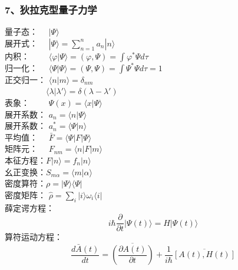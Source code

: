 \begin{frame}  [allowframebreaks=]
    \frametitle{7、狄拉克型量子力学}  
    量子态： $\hspace{1em}|\Psi \rangle $ \\ \vspace{0.2em}
    展开式： $\hspace{1em}|\Psi \rangle =\sum\limits_{n=1} ^n a_n |n \rangle$ \\
    内积：   $\hspace{2em}\langle \varphi | \Psi \rangle = (\varphi, \Psi)= \int \varphi^*\Psi d\tau $ \\  \vspace{0.2em}
    归一化： $\hspace{1em}\langle \Psi | \Psi \rangle = (\Psi, \Psi)= \int \Psi^*\Psi d\tau = 1 $ \\ \vspace{0.2em}
    正交归一： $\langle n | m \rangle = \delta_{nm} $ \\ \vspace{0.2em}
    $ \hspace{5em} \langle \lambda | \lambda' \rangle = \delta(\lambda-\lambda') $\\ \vspace{0.2em}
    表象： $\hspace{2em}\Psi(x)= \langle x | \Psi \rangle$ \\ \vspace{0.2em}
    展开系数： $ a_n= \langle n | \Psi \rangle$ \\ \vspace{0.2em}
    展开系数： $ a_n ^*= \langle \Psi | n \rangle$ \\ \vspace{0.2em}
    平均值：  $\hspace{1em}\bar{F} = \langle \Psi |F | \Psi \rangle$ \\ \vspace{0.2em}
    矩阵元：  $\hspace{1em}F_{nm} = \langle n |F | m \rangle$ \\ \vspace{0.2em}
    本征方程：$F|n\rangle =f_n |n\rangle$ \\ \vspace{0.2em}
    幺正变换：$S_{m\alpha} =\langle m| \alpha \rangle $ \\ \vspace{0.2em}
    密度算符：$\rho = |\Psi\rangle\langle \Psi | $ \\ \vspace{0.2em}
    密度矩阵： $\hat{\rho} = \sum\limits_{i}| i \rangle  \omega_i \langle i | $ \\ \vspace{0.2em}
    薛定谔方程：$$ i\hbar \frac{\partial }{\partial t} |\Psi(t)\rangle = H|\Psi(t)\rangle $$ 
    算符运动方程：$$ \frac{d\bar{A}(t)}{dt}=\overline{(\frac{\partial A(t) }{\partial t})}  +\frac{1}{i\hbar} \overline{[A(t),H(t)]}$$
\end{frame} 
 
